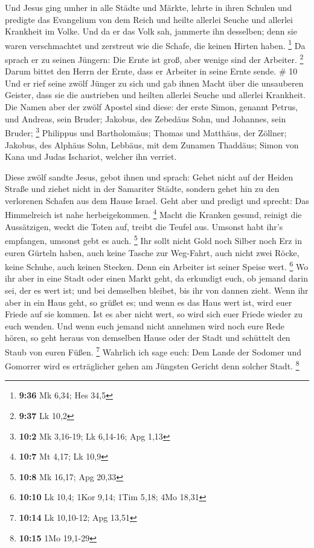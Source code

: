  Und Jesus ging umher in alle Städte und Märkte, lehrte in
ihren Schulen und predigte das Evangelium von dem Reich und heilte
allerlei Seuche und allerlei Krankheit im Volke.  Und da er
das Volk sah, jammerte ihn desselben; denn sie waren verschmachtet und
zerstreut wie die Schafe, die keinen Hirten haben. \footnote{\textbf{9:36}
  Mk 6,34; Hes 34,5}  Da sprach er zu seinen Jüngern: Die
Ernte ist groß, aber wenige sind der Arbeiter. \footnote{\textbf{9:37}
  Lk 10,2}  Darum bittet den Herrn der Ernte, dass er
Arbeiter in seine Ernte sende. \# 10  Und er rief seine
zwölf Jünger zu sich und gab ihnen Macht über die unsauberen Geister,
dass sie die austrieben und heilten allerlei Seuche und allerlei
Krankheit.  Die Namen aber der zwölf Apostel sind diese: der
erste Simon, genannt Petrus, und Andreas, sein Bruder; Jakobus, des
Zebedäus Sohn, und Johannes, sein Bruder; \footnote{\textbf{10:2} Mk
  3,16-19; Lk 6,14-16; Apg 1,13}  Philippus und
Bartholomäus; Thomas und Matthäus, der Zöllner; Jakobus, des Alphäus
Sohn, Lebbäus, mit dem Zunamen Thaddäus;  Simon von Kana und
Judas Ischariot, welcher ihn verriet.

 Diese zwölf sandte Jesus, gebot ihnen und sprach: Gehet
nicht auf der Heiden Straße und ziehet nicht in der Samariter Städte,
 sondern gehet hin zu den verlorenen Schafen aus dem Hause
Israel.  Geht aber und predigt und sprecht: Das Himmelreich
ist nahe herbeigekommen. \footnote{\textbf{10:7} Mt 4,17; Lk 10,9}
 Macht die Kranken gesund, reinigt die Aussätzigen, weckt
die Toten auf, treibt die Teufel aus. Umsonst habt ihr's empfangen,
umsonst gebt es auch. \footnote{\textbf{10:8} Mk 16,17; Apg 20,33}
 Ihr sollt nicht Gold noch Silber noch Erz in euren Gürteln
haben,  auch keine Tasche zur Weg-Fahrt, auch nicht zwei
Röcke, keine Schuhe, auch keinen Stecken. Denn ein Arbeiter ist seiner
Speise wert. \footnote{\textbf{10:10} Lk 10,4; 1Kor 9,14; 1Tim 5,18; 4Mo
  18,31}  Wo ihr aber in eine Stadt oder einen Markt geht,
da erkundigt euch, ob jemand darin sei, der es wert ist; und bei
demselben bleibet, bis ihr von dannen zieht.  Wenn ihr aber
in ein Haus geht, so grüßet es;  und wenn es das Haus wert
ist, wird euer Friede auf sie kommen. Ist es aber nicht wert, so wird
sich euer Friede wieder zu euch wenden.  Und wenn euch
jemand nicht annehmen wird noch eure Rede hören, so geht heraus von
demselben Hause oder der Stadt und schüttelt den Staub von euren Füßen.
\footnote{\textbf{10:14} Lk 10,10-12; Apg 13,51}  Wahrlich
ich sage euch: Dem Lande der Sodomer und Gomorrer wird es erträglicher
gehen am Jüngsten Gericht denn solcher Stadt. \footnote{\textbf{10:15}
  1Mo 19,1-29}


